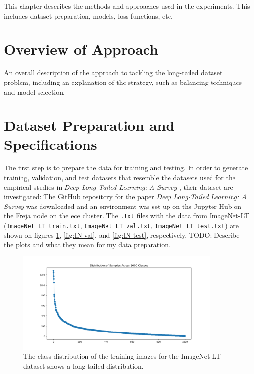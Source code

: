 
This chapter describes the methods and approaches used in the experiments. This includes dataset preparation, models, loss functions, etc.

\section{Overview of Approach}
An overall description of the approach to tackling the long-tailed dataset problem, including an explanation of the strategy, 
such as balancing techniques and model selection.

\section{Dataset Preparation and Specifications}
The first step is to prepare the data for training and testing. In order to generate training, validation, and test datasets that resemble the datasets used for the empirical studies in \textit{Deep Long-Tailed Learning: A Survey} \cite{zhang2023deep}, their dataset are investigated: The GitHub repository \cite{VanintLT} for the paper \textit{Deep Long-Tailed Learning: A Survey} was downloaded and an environment was set up on the Jupyter Hub on the Freja node on the ece cluster. The \texttt{.txt} files with the data from ImageNet-LT (\texttt{ImageNet\_LT\_train.txt}, \texttt{ImageNet\_LT\_val.txt}, \texttt{ImageNet\_LT\_test.txt}) are shown on figures \ref{fig:IN-train}, \ref{fig:IN-val}, and \ref{fig:IN-test}, respectively. TODO: Describe the plots and what they mean for my data preparation. 

\begin{figure}[h!]
    \centering
    \includegraphics[width=0.9\textwidth]{Images/Plots/class_distribution_train.png}
    \caption{The class distribution of the training images for the ImageNet-LT dataset shows a long-tailed distribution.}
    \label{fig:IN-train}
\end{figure}

